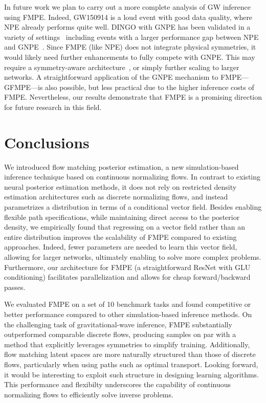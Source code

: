 \documentclass{article}
\theoremstyle{remark}
\begin{document}
In future work we plan to carry out a more complete analysis of GW inference using FMPE. Indeed, GW150914 is a loud event with good data quality, where NPE already performs quite well. DINGO with GNPE has been validated in a variety of settings~\cite{Dax:2021tsq,Dax:2021myb,Dax:2022pxd,Wildberger:2022agw} including events with a larger performance gap between NPE and GNPE~\cite{Dax:2021myb}. Since FMPE (like NPE) does not integrate physical symmetries, it would likely need further enhancements to fully compete with GNPE. This may require a symmetry-aware architecture~\cite{cohen2016group}, or simply further scaling to larger networks. A straightforward application of the GNPE mechanism to FMPE---GFMPE---is also possible, but less practical due to the higher inference costs of FMPE.  
Nevertheless, our results demonstrate that FMPE is a promising direction for future research in this field. 

\section{Conclusions}
We introduced flow matching posterior estimation, a new simulation-based inference technique based on continuous normalizing flows. In contrast to existing neural posterior estimation methods, it does not rely on restricted density estimation architectures such as discrete normalizing flows, and instead parametrizes a distribution in terms of a conditional vector field. Besides enabling flexible path specifications, while maintaining direct access to the posterior density, we empirically found that regressing on a vector field rather than an entire distribution improves the scalability of FMPE compared to existing approaches. Indeed, fewer parameters are needed to learn this vector field, allowing for larger networks, ultimately enabling to solve more complex problems. Furthermore, our architecture for FMPE (a straightforward ResNet with GLU conditioning) facilitates parallelization and allows for cheap forward/backward passes.


We evaluated FMPE on a set of 10 benchmark tasks and found competitive or better performance compared to other simulation-based inference methods. On the challenging task of gravitational-wave inference, FMPE substantially outperformed comparable discrete flows, producing samples on par with a method that explicitly leverages symmetries to simplify training. Additionally, flow matching latent spaces are more naturally structured than those of discrete flows, particularly when using paths such as optimal transport. Looking forward, it would be interesting to exploit such structure in designing learning algorithms. This performance and flexibilty underscores the capability of continuous normalizing flows to efficiently solve inverse problems. 
\end{document}
